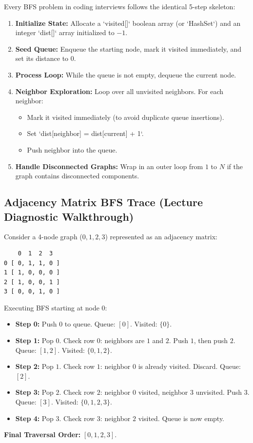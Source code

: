 \documentclass[10pt,journal,compsoc,onecolumn]{IEEEtran}
\begin{document}
Every BFS problem in coding interviews follows the identical 5-step skeleton:
\begin{enumerate}
    \item \textbf{Initialize State:} Allocate a `visited[]` boolean array (or `HashSet`) and an integer `dist[]` array initialized to $-1$.
    \item \textbf{Seed Queue:} Enqueue the starting node, mark it visited immediately, and set its distance to $0$.
    \item \textbf{Process Loop:} While the queue is not empty, dequeue the current node.
    \item \textbf{Neighbor Exploration:} Loop over all unvisited neighbors. For each neighbor:
    \begin{itemize}
        \item Mark it visited immediately (to avoid duplicate queue insertions).
        \item Set `dist[neighbor] = dist[current] + 1`.
        \item Push neighbor into the queue.
    \end{itemize}
    \item \textbf{Handle Disconnected Graphs:} Wrap in an outer loop from $1$ to $N$ if the graph contains disconnected components.
\end{enumerate}

\subsection{Adjacency Matrix BFS Trace (Lecture Diagnostic Walkthrough)}

Consider a 4-node graph ($0, 1, 2, 3$) represented as an adjacency matrix:
\begin{verbatim}
    0  1  2  3
0 [ 0, 1, 1, 0 ]
1 [ 1, 0, 0, 0 ]
2 [ 1, 0, 0, 1 ]
3 [ 0, 0, 1, 0 ]
\end{verbatim}
Executing BFS starting at node $0$:
\begin{itemize}
    \item \textbf{Step 0:} Push $0$ to queue. Queue: $[0]$. Visited: $\{0\}$.
    \item \textbf{Step 1:} Pop $0$. Check row $0$: neighbors are $1$ and $2$. Push $1$, then push $2$. Queue: $[1, 2]$. Visited: $\{0, 1, 2\}$.
    \item \textbf{Step 2:} Pop $1$. Check row $1$: neighbor $0$ is already visited. Discard. Queue: $[2]$.
    \item \textbf{Step 3:} Pop $2$. Check row $2$: neighbor $0$ visited, neighbor $3$ unvisited. Push $3$. Queue: $[3]$. Visited: $\{0, 1, 2, 3\}$.
    \item \textbf{Step 4:} Pop $3$. Check row $3$: neighbor $2$ visited. Queue is now empty.
\end{itemize}
\textbf{Final Traversal Order:} $[0, 1, 2, 3]$.
\end{document}
